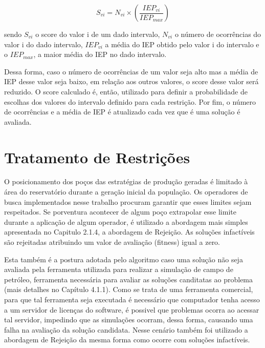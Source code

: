 $$ S_{vi} = N_{vi} \times (\frac{IEP_{vi}}{IEP_{max}})$$ 
  
sendo $S_{vi}$ o score do valor i de um dado intervalo, $N_{vi}$ o número de ocorrências do valor i do dado intervalo, $IEP_{vi}$ a média do IEP obtido pelo valor i do intervalo e o $IEP_{max}$, a maior média do IEP no dado intervalo. 

Dessa forma, caso o número de ocorrências de um valor seja alto mas a média de IEP desse valor seja baixo, em relação aos outros valores, o score desse valor será reduzido. O score calculado é, então, utilizado para definir a probabilidade de escolhas dos valores do intervalo definido para cada restrição. Por fim, o número de ocorrências e a média de IEP é atualizado cada vez que é uma solução é avaliada.

\section{Tratamento de Restrições}

O posicionamento dos poços das estratégias de produção geradas é limitado à área do reservatório durante a geração inicial da população. Os operadores de busca implementados nesse trabalho procuram garantir que esses limites sejam respeitados. Se porventura acontecer de algum poço extrapolar esse limite durante a aplicação de algum operador, é utilizado a abordagem mais simples apresentada no Capitulo 2.1.4, a abordagem de Rejeição. As soluções infactíveis são rejeitadas atribuindo um valor de avaliação (fitness) igual a zero.

 
Esta também é a postura adotada pelo algoritmo caso uma solução não seja avaliada pela ferramenta utilizada para realizar a simulação de campo de petróleo, ferramenta necessária para avaliar as soluções canditatas ao problema (mais detalhes no Capítulo 4.1.1). Como se trata de uma ferramenta comercial, para que tal ferramenta seja executada é necessário que computador tenha acesso a um servidor de licenças do software, é possivel que problemas ocorra ao acessar tal servidor, impedindo que as simulações ocorram, dessa forma, causando uma falha na avaliação da solução candidata. Nesse cenário também foi utilizado a abordagem de Rejeição da mesma forma como ocorre com soluções infactíveis.